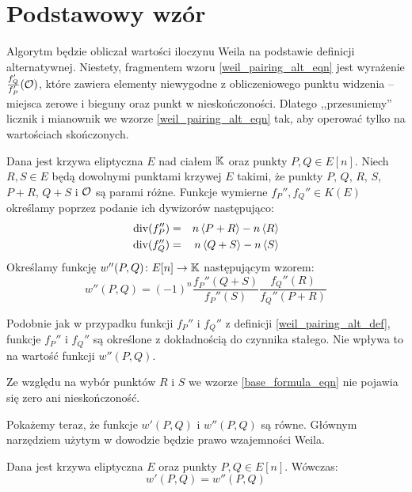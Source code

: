 \section{Podstawowy wzór}

\noindent
Algorytm będzie obliczał wartości iloczynu Weila
na podstawie definicji alternatywnej.
Niestety, fragmentem wzoru \ref{weil_pairing_alt_eqn}
jest wyrażenie $\frac{f_Q'}{f_P'}(\mathcal{O})$,
które zawiera elementy niewygodne z obliczeniowego punktu widzenia --
miejsca zerowe i bieguny oraz punkt w nieskończoności.
Dlatego ,,przesuniemy'' licznik i mianownik
we wzorze \ref{weil_pairing_alt_eqn} tak,
aby operować tylko na wartościach skończonych.

\begin{definition}\label{base_formula_def}
Dana jest krzywa eliptyczna $E$ nad ciałem $\mathbb{K}$
oraz punkty $P, Q \in E[n]$.
Niech $R, S \in E$ będą dowolnymi punktami krzywej $E$ takimi,
że punkty $P$, $Q$, $R$, $S$, $P+R$, $Q+S$ i $\mathcal{O}$ są parami różne.
Funkcje wymierne $f_P'', f_Q'' \in K(E)$
określamy poprzez podanie ich dywizorów
następująco:
\begin{eqnarray*}
\operatorname{div}(f_P'') & = & n\left\langle P+R\right\rangle - n\left\langle R\right\rangle \\
\operatorname{div}(f_Q'') & = & n\left\langle Q+S\right\rangle - n\left\langle S\right\rangle
\end{eqnarray*}
Określamy funkcję $w''(P, Q)\colon E[n] \to \mathbb{K}$
następującym wzorem:
\begin{equation}\label{base_formula_eqn}
w''(P, Q) = (-1)^n\frac{f_P''(Q+S)}{f_P''(S)}\frac{f_Q''(R)}{f_Q''(P+R)}
\end{equation}
\end{definition}

\begin{remark}
Podobnie jak w przypadku funkcji
$f_P''$ i $f_Q''$ z definicji \ref{weil_pairing_alt_def},
funkcje $f_P''$ i $f_Q''$
są określone z dokładnością do czynnika stałego.
Nie wpływa to na wartość funkcji $w''(P, Q)$.
\end{remark}

\begin{remark}
Ze względu na wybór punktów $R$ i $S$
we wzorze \ref{base_formula_eqn} nie pojawia się zero ani nieskończoność.
\end{remark}

\noindent
Pokażemy teraz, że funkcje $w'(P, Q)$ i $w''(P, Q)$ są równe.
Głównym narzędziem użytym w dowodzie będzie prawo wzajemności Weila.

\begin{theorem}
Dana jest krzywa eliptyczna $E$ oraz punkty $P, Q \in E[n]$.
Wówczas:
\begin{equation}
w'(P, Q) = w''(P, Q)
\end{equation}
\end{theorem}

